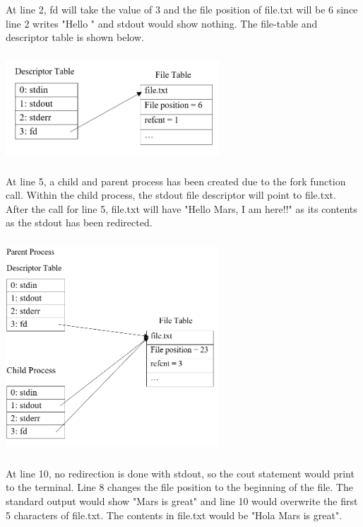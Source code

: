 \documentclass[12pt]{article}
\begin{document}
At line 2, fd will take the value of 3 and the file position of file.txt will be 6 since line 2 writes "Hello " and stdout would show nothing. The file-table and descriptor table is shown below. 

\begin{center}
\includegraphics[width=8cm, height=4cm]{P6Line2}
\end{center}

At line 5, a child and parent process has been created due to the fork function call. Within the child process, the stdout file descriptor will point to file.txt. After the call for line 5, file.txt will have "Hello Mars, I am here!!" as its contents as the stdout has been redirected. 

\begin{center}
\includegraphics[width=8cm, height=8cm]{P6Line5}
\end{center}

At line 10, no redirection is done with stdout, so the cout statement would print to the terminal. Line 8 changes the file position to the beginning of the file. The standard output would show "Mars is great" and line 10 would overwrite the first 5 characters of file.txt. The contents in file.txt would be "Hola  Mars is great". 
\end{document}
